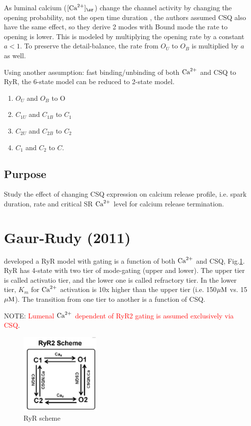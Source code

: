 As luminal calcium ($[\Ca]_\sr$) change the channel activity by changing the
opening probability, not the open time duration \citep{gyorke1998}, the authors
assumed CSQ also have the same effect, so they derive 2 modes with Bound mode
the rate to opening is lower. This is modeled by multiplying the opening rate by
a constant $a < 1$. To preserve the detail-balance, the rate from $O_U$ to $O_B$
is multiplied by $a$ as well.

Using another assumption: fast binding/unbinding of both ${\text{Ca}^{2+}}$ and CSQ to RyR,
the 6-state model can be reduced to 2-state model.
\begin{enumerate}
  \item $O_U$ and $O_B$ to O
  \item $C_{1U}$ and $C_{1B}$ to $C_1$
  \item $C_{2U}$ and $C_{2B}$ to $C_2$
  \item $C_1$ and $C_2$ to $C$.
\end{enumerate}

\subsection{Purpose}

Study the effect of changing CSQ expression on calcium release profile, i.e.
spark duration, rate and critical SR ${\text{Ca}^{2+}}$ level for calcium release
termination.

\section{Gaur-Rudy (2011)}
\label{sec:RyR_Gaur2011}

\citep{Gaur2011} developed a RyR model with gating is a function of both ${\text{Ca}^{2+}}$
and CSQ, Fig.\ref{fig:RyR_Gaur2011}. RyR has 4-state with two tier of
mode-gating (upper and lower). The upper tier is called activatio tier, and the
lower one is called refractory tier. In the lower tier, $K_m$ for ${\text{Ca}^{2+}}$
activation is 10x higher than the upper tier (i.e. 150${\mu\text{M}}$ vs. 15${\mu\text{M}}$). The
transition from one tier to another is a function of CSQ.

NOTE: \textcolor{red}{Lumenal ${\text{Ca}^{2+}}$ dependent of RyR2 gating is assumed
exclusively via CSQ}.

\begin{figure}[hbt]
  \centerline{\includegraphics[height=4cm,
    angle=0]{./images/RyR_Gaur2011.eps}}
\caption{RyR scheme}
\label{fig:RyR_Gaur2011}
\end{figure}

